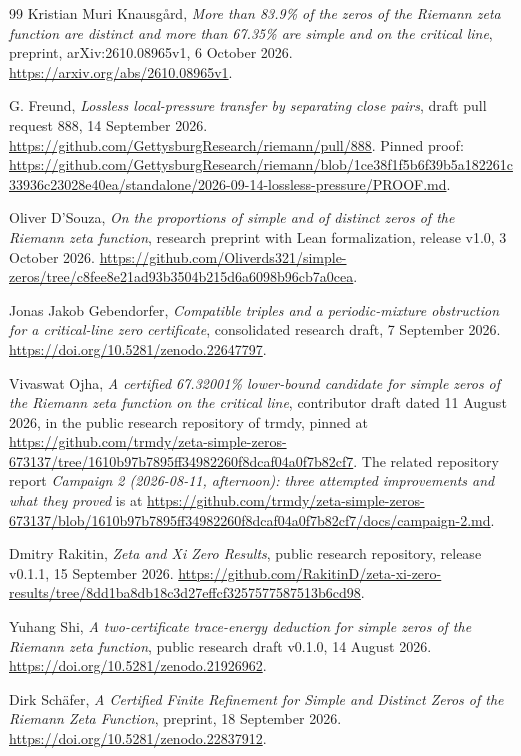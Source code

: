 \documentclass[11pt,reqno]{amsart}
\numberwithin{equation}{section}
\begin{document}
\begin{thebibliography}{99}
Kristian Muri Knausg{\aa}rd,
\emph{More than 83.9\% of the zeros of the Riemann zeta function
are distinct and more than 67.35\% are simple and on the critical line},
preprint, arXiv:2610.08965v1, 6 October 2026.
\url{https://arxiv.org/abs/2610.08965v1}.

G. Freund,
\emph{Lossless local-pressure transfer by separating close pairs},
draft pull request 888, 14 September 2026.
\url{https://github.com/GettysburgResearch/riemann/pull/888}.
Pinned proof:
\url{https://github.com/GettysburgResearch/riemann/blob/1ce38f1f5b6f39b5a182261c33936c23028e40ea/standalone/2026-09-14-lossless-pressure/PROOF.md}.

Oliver D'Souza,
\emph{On the proportions of simple and of distinct zeros
of the Riemann zeta function},
research preprint with Lean formalization, release v1.0, 3 October 2026.
\url{https://github.com/Oliverds321/simple-zeros/tree/c8fee8e21ad93b3504b215d6a6098b96cb7a0cea}.

Jonas Jakob Gebendorfer,
\emph{Compatible triples and a periodic-mixture obstruction
for a critical-line zero certificate},
consolidated research draft, 7 September 2026.
\url{https://doi.org/10.5281/zenodo.22647797}.

Vivaswat Ojha,
\emph{A certified 67.32001\% lower-bound candidate for simple zeros
of the Riemann zeta function on the critical line},
contributor draft dated 11 August 2026, in the public research repository
of trmdy, pinned at
\url{https://github.com/trmdy/zeta-simple-zeros-673137/tree/1610b97b7895ff34982260f8dcaf04a0f7b82cf7}.
The related repository report
\emph{Campaign 2 (2026-08-11, afternoon): three attempted improvements
and what they proved} is at
\url{https://github.com/trmdy/zeta-simple-zeros-673137/blob/1610b97b7895ff34982260f8dcaf04a0f7b82cf7/docs/campaign-2.md}.

Dmitry Rakitin,
\emph{Zeta and Xi Zero Results},
public research repository, release v0.1.1, 15 September 2026.
\url{https://github.com/RakitinD/zeta-xi-zero-results/tree/8dd1ba8db18c3d27effcf3257577587513b6cd98}.

Yuhang Shi,
\emph{A two-certificate trace-energy deduction for simple zeros
of the Riemann zeta function},
public research draft v0.1.0, 14 August 2026.
\url{https://doi.org/10.5281/zenodo.21926962}.

Dirk Sch\"afer,
\emph{A Certified Finite Refinement for Simple and Distinct Zeros
of the Riemann Zeta Function},
preprint, 18 September 2026.
\url{https://doi.org/10.5281/zenodo.22837912}.


\end{thebibliography}
\end{document}
